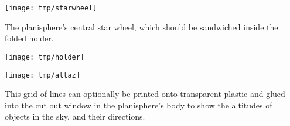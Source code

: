 \documentclass[a4paper,onecolumn,10pt]{article}
\begin{document}

\centerline{\texttt{[image: tmp/starwheel]}}

\vspace{1cm}
The planisphere's central star wheel, which should be sandwiched inside the folded holder.

\newpage
\thispagestyle{empty}
\vspace*{-3.0cm}
\centerline{\texttt{[image: tmp/holder]}}
\newpage

\centerline{\texttt{[image: tmp/altaz]}}

\vspace{1cm}
This grid of lines can optionally be printed onto transparent plastic and glued into the cut out window in the planisphere's body to show the altitudes of objects in the sky, and their directions.
\end{document}
